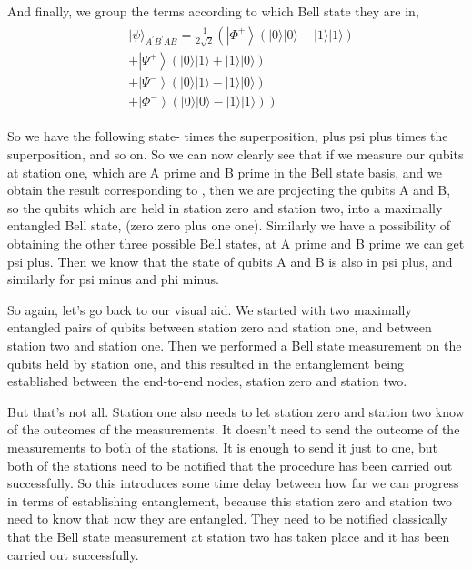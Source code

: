 And finally, we group the terms according to which Bell state they are in,
\begin{align}
\begin{aligned}
&|\psi\rangle_{A^{\prime} B^{\prime} A B}=\frac{1}{2 \sqrt{2}}\left(\left|\Phi^{+}\right\rangle(|0\rangle|0\rangle+|1\rangle|1\rangle)\right.\\
&+\left|\Psi^{+}\right\rangle(|0\rangle|1\rangle+|1\rangle|0\rangle)\\
&+\left|\Psi^{-}\right\rangle(|0\rangle|1\rangle-|1\rangle|0\rangle)\\
&\left.+\left|\Phi^{-}\right\rangle(|0\rangle|0\rangle-|1\rangle|1\rangle)\right)
\end{aligned}
\end{align}

So we have the following state-  \ket{\Phi^+} times the superposition, plus psi plus times the superposition, and so on. So we can now clearly see that if we measure our qubits at station one, which are A prime and B prime in the Bell state basis, and we obtain the result corresponding to  \ket{\Phi^+}, then we are projecting the qubits A and B, so the qubits which are held in station zero and station two, into a maximally entangled Bell state,  \ket{\Phi^+} (zero zero plus one one). Similarly we have a possibility of obtaining the other three possible Bell states, at A prime and B prime we can get psi plus. Then we know that the state of qubits A and B is also in psi plus, and similarly for psi minus and phi minus.

So again, let's go back to our visual aid. We started with two maximally entangled pairs of qubits between station zero and station one, and between station two and station one. Then we performed a Bell state measurement on the qubits held by station one, and this resulted in the entanglement being established between the end-to-end nodes, station zero and station two.

But that's not all. Station one also needs to let station zero and station two know of the outcomes of the measurements. It doesn't need to send the outcome of the measurements to both of the stations. It is enough to send it just to one, but both of the stations need to be notified that the procedure has been carried out successfully. So this introduces some time delay between how far we can progress in terms of establishing entanglement, because this station zero and station two need to know that now they are entangled. They need to be notified classically that the Bell state measurement at station two has taken place and it has been carried out successfully.

